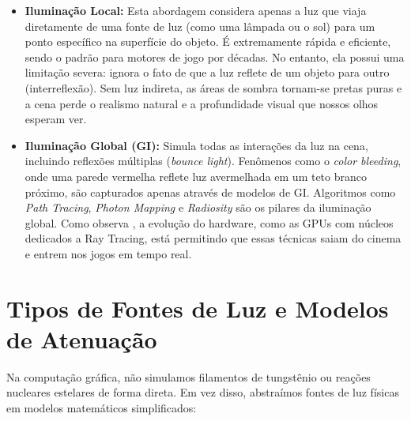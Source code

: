 \begin{itemize}
    \item \textbf{Iluminação Local:} Esta abordagem considera apenas a luz que viaja diretamente de uma fonte de luz (como uma lâmpada ou o sol) para um ponto específico na superfície do objeto. É extremamente rápida e eficiente, sendo o padrão para motores de jogo por décadas. No entanto, ela possui uma limitação severa: ignora o fato de que a luz reflete de um objeto para outro (interreflexão). Sem luz indireta, as áreas de sombra tornam-se pretas puras e a cena perde o realismo natural e a profundidade visual que nossos olhos esperam ver.
    \item \textbf{Iluminação Global (GI):} Simula todas as interações da luz na cena, incluindo reflexões múltiplas (\textit{bounce light}). Fenômenos como o \textit{color bleeding}, onde uma parede vermelha reflete luz avermelhada em um teto branco próximo, são capturados apenas através de modelos de GI. Algoritmos como \textit{Path Tracing}, \textit{Photon Mapping} e \textit{Radiosity} são os pilares da iluminação global. Como observa \textcite{akenine2018realtime}, a evolução do hardware, como as GPUs com núcleos dedicados a Ray Tracing, está permitindo que essas técnicas saiam do cinema e entrem nos jogos em tempo real.
\end{itemize}

\section{Tipos de Fontes de Luz e Modelos de Atenuação}

Na computação gráfica, não simulamos filamentos de tungstênio ou reações nucleares estelares de forma direta. Em vez disso, abstraímos fontes de luz físicas em modelos matemáticos simplificados:

